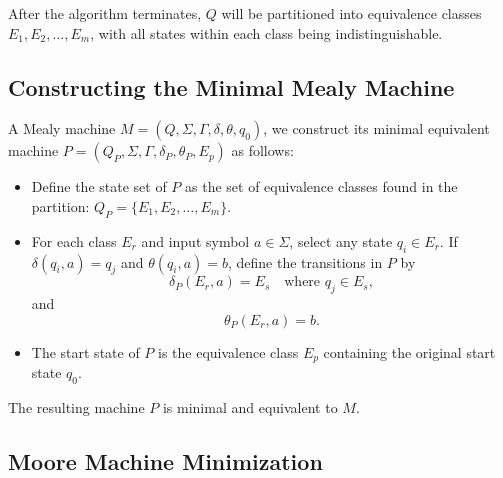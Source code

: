 After the algorithm terminates, \(Q\) will be partitioned into equivalence classes \(E_1, E_2, \ldots, E_m\),
with all states within each class being indistinguishable.

\subsection*{Constructing the Minimal Mealy Machine}

A Mealy machine \(M = (Q, \Sigma, \Gamma, \delta, \theta, q_0)\), we construct its minimal equivalent machine \(P = (Q_P, \Sigma, \Gamma, \delta_P, \theta_P, E_p)\) as follows:
\begin{itemize}
    \item Define the state set of \(P\) as the set of equivalence classes found in the partition: \(Q_P = \{E_1, E_2, \ldots, E_m\}\).
    \item For each class \(E_r\) and input symbol \(a \in \Sigma\), 
    select any state \(q_i \in E_r\). If \(\delta(q_i, a) = q_j\) and \(\theta(q_i, a) = b\), define the transitions in \(P\) by
    \[
    \delta_P(E_r, a) = E_s \quad \text{where } q_j \in E_s,
    \]
    and
    \[
    \theta_P(E_r, a) = b.
    \]
    \item The start state of \(P\) is the equivalence class \(E_p\) containing the original start state \(q_0\).
\end{itemize}
The resulting machine \(P\) is minimal and equivalent to \(M\).

\subsection{Moore Machine Minimization}

